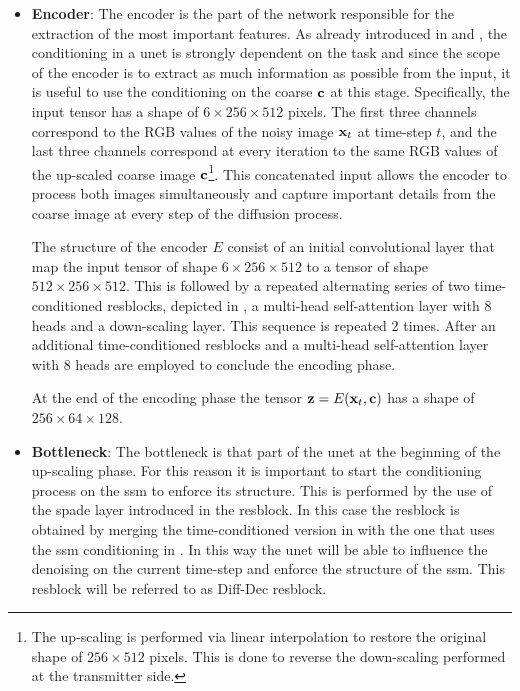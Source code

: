 \begin{itemize}[label={}]
    \item {\textbf{Encoder}:} The encoder is the part of the network responsible for the extraction of the most important features. As already introduced in  and , the conditioning in a \gls{unet} is strongly dependent on the task and since the scope of the encoder is to extract as much information as possible from the input, it is useful to use the conditioning on the coarse $\mathbf{c}$ at this stage. Specifically, the input tensor has a shape of $6 \times 256 \times 512$ pixels. The first three channels correspond to the RGB values of the noisy image $\mathbf{x}_t$ at time-step $t$, and the last three channels correspond at every iteration to the same RGB values of the up-scaled coarse image $\mathbf{c}$\footnote{The up-scaling is performed via linear interpolation to restore the original shape of $256 \times 512$ pixels. This is done to reverse the down-scaling performed at the transmitter side.}. This concatenated input allows the encoder to process both images simultaneously and capture important details from the coarse image at every step of the diffusion process. 
    
    The structure of the encoder $E$ consist of an initial convolutional layer that map the input tensor of shape $6 \times 256 \times 512$ to a tensor of shape $512 \times 256 \times 512$. This is followed by a repeated alternating series of two time-conditioned \glspl{resblock}, depicted in , a multi-head self-attention layer with 8 heads and a down-scaling layer. This sequence is repeated 2 times. After an additional time-conditioned \glspl{resblock} and a multi-head self-attention layer with 8 heads are employed to conclude the encoding phase. 
    
    At the end of the encoding phase the tensor $\mathbf{z} = E(\mathbf{x}_t, \mathbf{c})$ has a shape of $256 \times 64 \times 128$.\\
    \item {\textbf{Bottleneck}:} The bottleneck is that part of the \gls{unet} at the beginning of the up-scaling phase. For this reason it is important to start the conditioning process on the \gls{ssm} to enforce its structure. This is performed by the use of the \gls{spade} layer introduced in the \gls{resblock}. In this case the \gls{resblock} is obtained by merging the time-conditioned version in  with the one that uses the \gls{ssm} conditioning in  \cite{Wang2022SISDM}. In this way the \gls{unet} will be able to influence the denoising on the current time-step and enforce the structure of the \gls{ssm}. This \gls{resblock} will be referred to as Diff-Dec \gls{resblock}.
    

\end{itemize}
